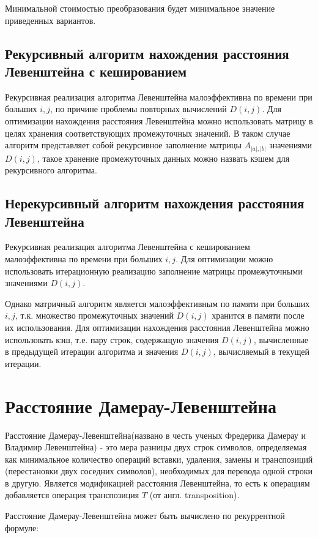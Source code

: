 Минимальной стоимостью преобразования будет минимальное значение приведенных вариантов.

\subsection{Рекурсивный алгоритм нахождения расстояния Левенштейна с кешированием}

Рекурсивная реализация алгоритма Левенштейна малоэффективна по времени при больших $i, j$, по причине проблемы повторных вычислений $D(i,j)$. Для оптимизации нахождения расстояния Левенштейна можно использовать матрицу в целях хранения соответствующих промежуточных значений. В таком случае алгоритм представляет собой рекурсивное заполнение матрицы $A_{|a|,|b|}$ значениями $D(i,j)$, такое хранение промежуточных данных можно назвать кэшем для рекурсивного алгоритма.

\subsection{Нерекурсивный алгоритм нахождения расстояния Левенштейна}

Рекурсивная реализация алгоритма Левенштейна с кешированием малоэффективна по времени при больших $i, j$. Для оптимизации можно использовать итерационную реализацию заполнение матрицы промежуточными значениями $D(i,j)$.

Однако матричный алгоритм является малоэффективным по памяти при больших $i, j$, т.к. множество промежуточных значений $D(i,j)$ хранится в памяти после их использования. Для оптимизации нахождения расстояния Левенштейна можно использовать кэш, т.е. пару строк, содержащую значения $D(i,j)$, вычисленные в предыдущей итерации алгоритма и значения $D(i,j)$, вычисляемый в текущей итерации.

\section{Расстояние Дамерау-Левенштейна}
Расстояние Дамерау-Левенштейна(названо в честь ученых Фредерика Дамерау и Владимир Левенштейна) - это мера разницы двух строк символов, определяемая как минимальное количество операций вставки, удаления, замены и транспозиций (перестановки двух соседних символов), необходимых для перевода одной строки в другую. Является модификацией расстояния Левенштейна, то есть к операциям добавляется операция транспозиция $T$ (от англ. transposition).

Расстояние Дамерау-Левенштейна может быть вычислено по рекуррентной формуле:

